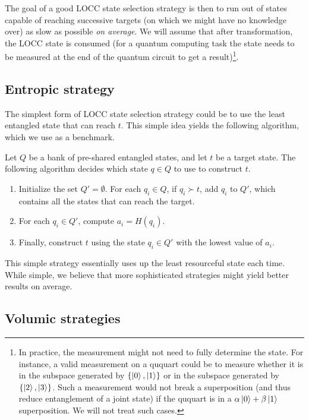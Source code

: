 The goal of a good LOCC state selection strategy is then to run out of states capable of reaching successive targets (on which we might have no knowledge over) as slow as possible \textit{on average}. We will assume that after transformation, the LOCC state is consumed (for a quantum computing task the state needs to be measured at the end of the quantum circuit to get a result)\footnote{In practice, the measurement might not need to fully determine the state. For instance, a valid measurement on a ququart could be to measure whether it is in the subspace generated by $\{\ket{0}, \ket{1}\}$ or in the subspace generated by $\{\ket{2}, \ket{3}\}$. Such a measurement would not break a superposition (and thus reduce entanglement of a joint state) if the ququart is in a $\alpha\ket{0} + \beta\ket{1}$ superposition. We will not treat such cases.}.



\subsection{Entropic strategy}

The simplest form of LOCC state selection strategy could be to use the least entangled state that can reach $t$. This simple idea yields the following algorithm, which we use as a benchmark.

\begin{definition}
    Let $Q$ be a bank of pre-shared entangled states, and let $t$ be a target state. The following algorithm decides which state $q \in Q$ to use to construct $t$.
    \begin{enumerate}
        \item Initialize the set $Q' = \emptyset$. For each $q_i \in Q$, if $q_i \succ t$, add $q_i$ to $Q'$, which contains all the states that can reach the target.
        \item For each $q_i \in Q'$, compute $a_i = H(q_i)$.
        \item Finally, construct $t$ using the state $q_i \in Q'$ with the lowest value of $a_i$.
    \end{enumerate}
\end{definition}

This simple strategy essentially uses up the least resourceful state each time. While simple, we believe that more sophisticated strategies might yield better results on average.



\subsection{Volumic strategies}

